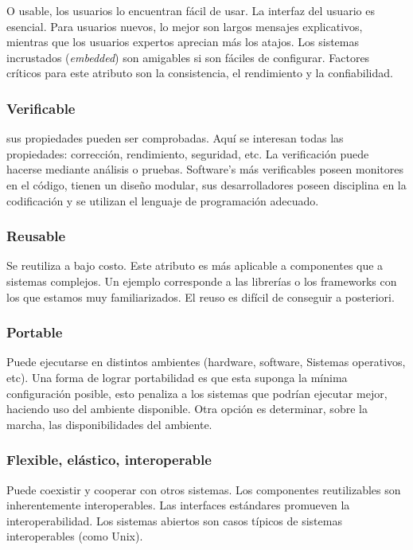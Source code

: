         O usable, los usuarios lo encuentran fácil de usar. La interfaz del usuario es esencial. Para usuarios nuevos, lo mejor son largos mensajes explicativos, mientras que los usuarios expertos aprecian más los atajos. Los sistemas incrustados (\textit{embedded}) son amigables si son fáciles de configurar. Factores críticos para este atributo son la consistencia, el rendimiento y la confiabilidad.
    
    \subsubsection*{Verificable}

        sus propiedades pueden ser comprobadas. Aquí se interesan todas las propiedades: corrección, rendimiento, seguridad, etc. La verificación puede hacerse mediante análisis o pruebas. Software's más verificables poseen monitores en el código, tienen un diseño modular, sus desarrolladores poseen disciplina en la codificación y se utilizan el lenguaje de programación adecuado.
    
    \subsubsection*{Reusable}

        Se reutiliza a bajo costo. Este atributo es más aplicable a componentes que a sistemas complejos. Un ejemplo corresponde a las librerías o los frameworks con los que estamos muy familiarizados. El reuso es difícil de conseguir a posteriori.
    
    \subsubsection*{Portable}

        Puede ejecutarse en distintos ambientes (hardware, software, Sistemas operativos, etc). Una forma de lograr portabilidad es que esta suponga la mínima configuración posible, esto penaliza a los sistemas que podrían ejecutar mejor, haciendo uso del ambiente disponible. Otra opción es determinar, sobre la marcha, las disponibilidades del ambiente.
    
    \subsubsection*{Flexible, elástico, interoperable}

        Puede coexistir y cooperar con otros sistemas. Los componentes reutilizables son inherentemente interoperables. Las interfaces estándares promueven la interoperabilidad. Los sistemas abiertos son casos típicos de sistemas interoperables (como Unix).
    
